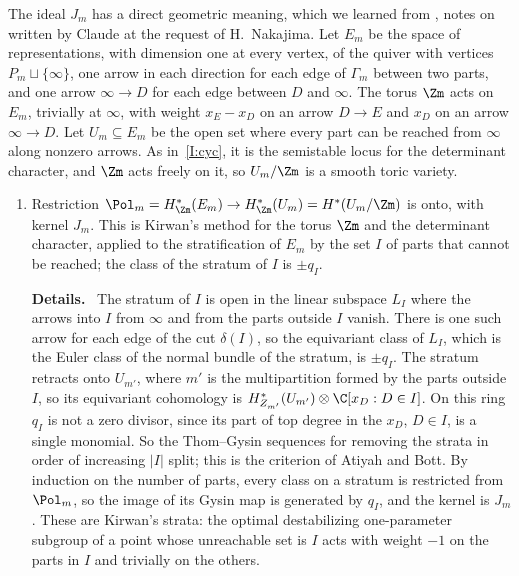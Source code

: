 \documentclass[11pt]{amsart}
\newenvironment{details}{\par\color{black!60!green}\noindent\textbf{Details.}\ }{\par}
\begin{document}
\begin{remark}\label{rem:kirwan}
The ideal $J_m$ has a direct geometric meaning, which we learned from
\cite[\S\S1--2]{nakajimaMultipartitionSpaces2026}, notes on  written by Claude at the request of
H.~Nakajima.  Let
$E_m$ be the space of representations, with dimension one at every vertex, of
the quiver with vertices $P_m\sqcup\{\infty\}$, one arrow in each direction for
each edge of $\Gamma_m$ between two parts, and one arrow $\infty\to D$ for each
edge between $D$ and $\infty$.  The torus $\Zm$ acts on $E_m$, trivially at
$\infty$, with weight $x_E-x_D$ on an arrow $D\to E$ and $x_D$ on an arrow
$\infty\to D$.  Let $U_m\subseteq E_m$ be the open set where every part can be
reached from $\infty$ along nonzero arrows.  As in~\ref{I:cyc}, it is the
semistable locus for the determinant character, and $\Zm$ acts freely on it,
so $U_m/\Zm$ is a smooth toric variety.
\begin{enumerate}[leftmargin=2em]
\item Restriction $\Pol_m=H^*_{\Zm}(E_m)\to H^*_{\Zm}(U_m)=H^*(U_m/\Zm)$ is
onto, with kernel $J_m$.  This is Kirwan's method
\cite{kirwanCohomologyQuotients1984} for the torus $\Zm$ and the determinant
character, applied to the stratification of $E_m$ by the set $I$ of parts that
cannot be reached; the class of the stratum of $I$ is $\pm q_I$.
\begin{details}
The stratum of $I$ is open in the linear subspace $L_I$
where the arrows into $I$ from $\infty$ and from the parts outside $I$ vanish.
There is one such arrow for each edge of the cut $\delta(I)$, so the
equivariant class of $L_I$, which is the Euler class of the normal bundle of
the stratum, is $\pm q_I$.  The stratum retracts onto $U_{m'}$, where $m'$ is
the multipartition formed by the parts outside $I$, so its equivariant
cohomology is $H^*_{Z_{m'}}(U_{m'})\otimes\C[x_D:D\in I]$.  On this ring $q_I$
is not a zero divisor, since its part of top degree in the $x_D$, $D\in I$, is
a single monomial.  So the Thom--Gysin sequences for removing the strata in
order of increasing $|I|$ split; this is the criterion of Atiyah and Bott.  By
induction on the number of parts, every class on a stratum is restricted from
$\Pol_m$, so the image of its Gysin map is generated by $q_I$, and the kernel is
$J_m$.  These are Kirwan's strata: the optimal destabilizing
one-parameter subgroup of a point whose unreachable set is $I$ acts with
weight $-1$ on the parts in $I$ and trivially on the others.
\end{details}

\end{enumerate}
\end{remark}
\end{document}
